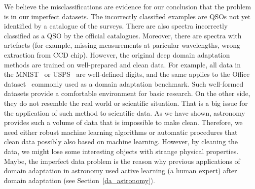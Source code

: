 We believe the misclassifications are evidence for our conclusion
that the problem is in our imperfect datasets.
The incorrectly classified examples are QSOs not yet identified by a catalogue of the surveys.
There are also spectra incorrectly classified as a QSO by the official catalogues.
Moreover, there are spectra with artefacts
(for example, missing measurements at paricular wavelengths, wrong extraction from CCD chip). 
However, the original deep domain adaptation methods are trained on well-prepared and clean data.
For example, all data in the MNIST~\cite{lecun1998} or USPS~\cite{hull1994} are well-defined digits,
and the same applies to the Office dataset~\cite{saenko2010} commonly used as a domain adaptation benchmark.
Such well-formed datasets provide a comfortable environment for basic research.
On the other side, they do not resemble the real world or scientific situation.
That is a big issue for the application of such method to scientific data.
As we have shown, astronomy provides such a volume of data that is impossible to make clean.
Therefore, we need either robust machine learning algorithms
or automatic procedures that clean data possibly also based on machine learning.
However, by cleaning the data, we might lose some interesting objects with strange physical properties.
Maybe, the imperfect data problem is the reason
why previous applications of domain adaptation in astronomy used active learning (a human expert)
after domain adaptation (see Section~\ref{da_astronomy}).

